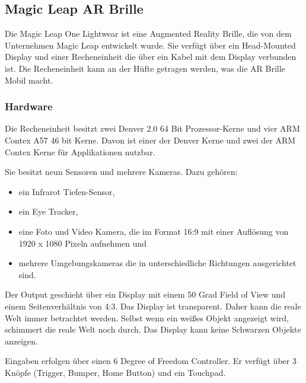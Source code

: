 
\subsection{Magic Leap AR Brille}

Die Magic Leap One Lightwear ist eine Augmented Reality Brille, die von dem Unternehmen Magic Leap entwickelt wurde. Sie verfügt über ein Head-Mounted Display und einer Recheneinheit die über ein Kabel mit dem Display verbunden ist. Die Recheneinheit kann an der Hüfte getragen werden, was die AR Brille Mobil macht. 


\subsubsection{Hardware}

Die Recheneinheit besitzt zwei Denver 2.0 64 Bit Prozessor-Kerne und vier ARM Contex A57 46 bit Kerne. Davon ist einer der Denver Kerne und zwei der ARM Contex Kerne für Applikationen nutzbar.  

Sie besitzt neun Sensoren und mehrere Kameras. Dazu gehören:
\begin{itemize}
	\item ein Infrarot Tiefen-Sensor,
	\item ein Eye Tracker,
	\item eine Foto und Video Kamera, die im Format 16:9 mit einer Auflösung von 1920 x 1080 Pixeln aufnehmen und
	\item mehrere Umgebungskameras die in unterschiedliche Richtungen ausgerichtet sind. \citep{mlofficialsalespitch,mlglossary}
\end{itemize}

Der Output geschieht über ein Display mit einem 50 Grad Field of View und einem Seitenverhältnis von 4:3. Das Display ist transparent. Daher kann die reale Welt immer betrachtet werden. Selbst wenn ein weißes Objekt angezeigt wird, schimmert die reale Welt noch durch. 
Das Display kann keine Schwarzen Objekte anzeigen. 

Eingaben erfolgen über einen 6 Degree of Freedom Controller. Er verfügt über 3 Knöpfe (Trigger, Bumper, Home Button) und ein Touchpad. \citep{mlofficialsalespitch,mlglossary}

